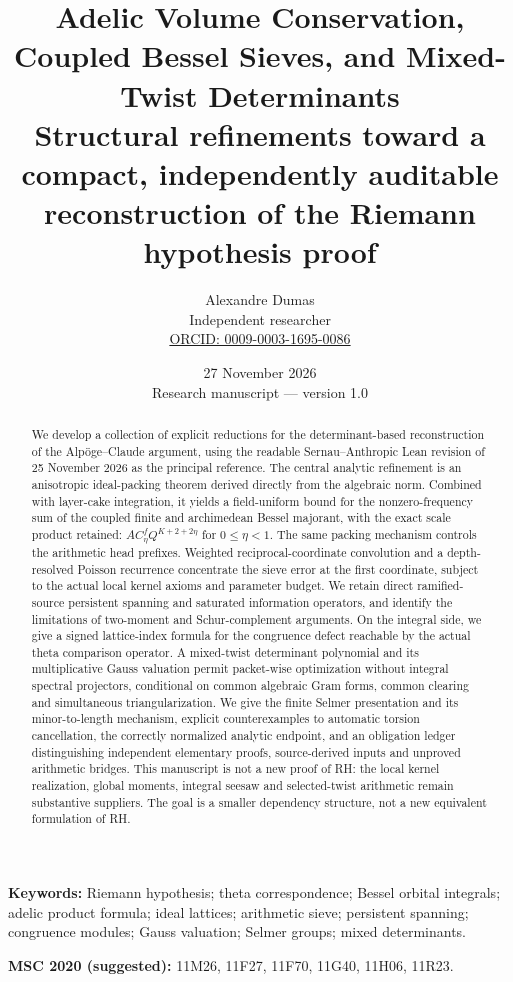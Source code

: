 \documentclass[11pt,a4paper]{article}
\title{\textbf{Adelic Volume Conservation, Coupled Bessel Sieves, and Mixed-Twist Determinants}\\[5pt]\large Structural refinements toward a compact, independently auditable reconstruction of the Riemann hypothesis proof}
\author{Alexandre Dumas\\ Independent researcher\\ \href{https://orcid.org/0009-0003-1695-0086}{ORCID: 0009-0003-1695-0086}}
\date{27 November 2026\\\small Research manuscript --- version 1.0}
\begin{document}
\maketitle
\begin{abstract}
We develop a collection of explicit reductions for the determinant-based reconstruction of the Alp\"oge--Claude argument, using the readable Sernau--Anthropic Lean revision of 25 November 2026 as the principal reference. The central analytic refinement is an anisotropic ideal-packing theorem derived directly from the algebraic norm. Combined with layer-cake integration, it yields a field-uniform bound for the nonzero-frequency sum of the coupled finite and archimedean Bessel majorant, with the exact scale product retained: $A C_\eta^f Q^{K+2+2\eta}$ for $0\leq\eta<1$. The same packing mechanism controls the arithmetic head prefixes. Weighted reciprocal-coordinate convolution and a depth-resolved Poisson recurrence concentrate the sieve error at the first coordinate, subject to the actual local kernel axioms and parameter budget. We retain direct ramified-source persistent spanning and saturated information operators, and identify the limitations of two-moment and Schur-complement arguments. On the integral side, we give a signed lattice-index formula for the congruence defect reachable by the actual theta comparison operator. A mixed-twist determinant polynomial and its multiplicative Gauss valuation permit packet-wise optimization without integral spectral projectors, conditional on common algebraic Gram forms, common clearing and simultaneous triangularization. We give the finite Selmer presentation and its minor-to-length mechanism, explicit counterexamples to automatic torsion cancellation, the correctly normalized analytic endpoint, and an obligation ledger distinguishing independent elementary proofs, source-derived inputs and unproved arithmetic bridges. This manuscript is not a new proof of RH: the local kernel realization, global moments, integral seesaw and selected-twist arithmetic remain substantive suppliers. The goal is a smaller dependency structure, not a new equivalent formulation of RH.
\end{abstract}
\noindent\textbf{Keywords:} Riemann hypothesis; theta correspondence; Bessel orbital integrals; adelic product formula; ideal lattices; arithmetic sieve; persistent spanning; congruence modules; Gauss valuation; Selmer groups; mixed determinants.\par
\noindent\textbf{MSC 2020 (suggested):} 11M26, 11F27, 11F70, 11G40, 11H06, 11R23.
\clearpage
\begingroup\small\tableofcontents\endgroup
\clearpage
\end{document}
